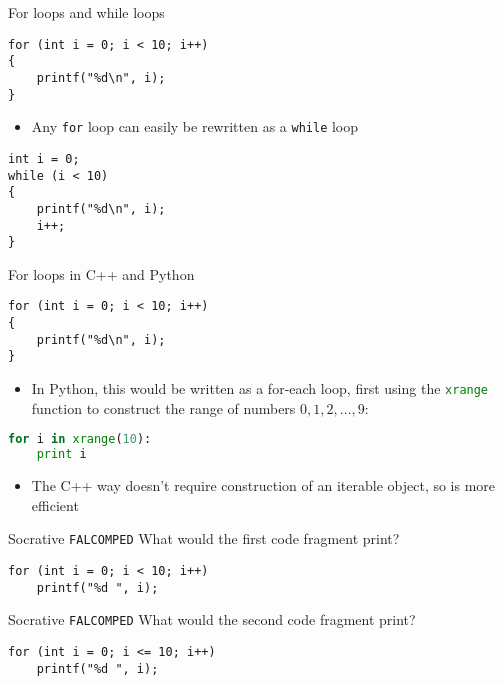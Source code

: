 \begin{frame}[fragile]{For loops and while loops}
	\begin{lstlisting}
for (int i = 0; i < 10; i++)
{
    printf("%d\n", i);
}
	\end{lstlisting}
    \begin{itemize}
        \item Any \lstinline{for} loop can easily be rewritten as a \lstinline{while} loop
    \end{itemize}
    \pause
	\begin{lstlisting}
int i = 0;
while (i < 10)
{
    printf("%d\n", i);
    i++;
}
	\end{lstlisting}
\end{frame}

\begin{frame}[fragile]{For loops in C++ and Python}
	\begin{lstlisting}
for (int i = 0; i < 10; i++)
{
    printf("%d\n", i);
}
	\end{lstlisting}
	\pause
    \begin{itemize}
        \item In Python, this would be written as a for-each loop, first using the \lstinline[language=Python]{xrange} function
        to construct the range of numbers $0, 1, 2, \dots, 9$:
    \end{itemize}
	\begin{lstlisting}[language=Python]
for i in xrange(10):
    print i
	\end{lstlisting}
	\pause
    \begin{itemize}
        \item The C++ way doesn't require construction of an iterable object, so is more efficient
    \end{itemize}
\end{frame}

\begin{frame}[fragile]{Socrative \texttt{FALCOMPED}}
    What would the first code fragment print?
	\begin{lstlisting}
for (int i = 0; i < 10; i++)
    printf("%d ", i);
	\end{lstlisting}
\end{frame}

\begin{frame}[fragile]{Socrative \texttt{FALCOMPED}}
    What would the second code fragment print?
	\begin{lstlisting}
for (int i = 0; i <= 10; i++)
    printf("%d ", i);
	\end{lstlisting}
\end{frame}

